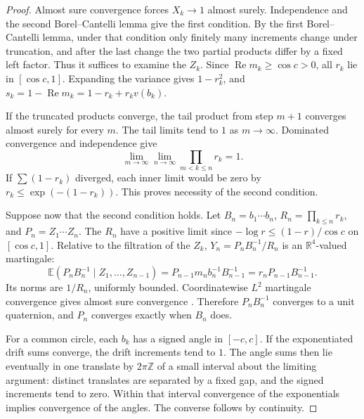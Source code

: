 \documentclass[11pt,reqno]{amsart}
\theoremstyle{definition}
\theoremstyle{remark}
\numberwithin{equation}{section}
\newcommand{\R}{\mathbb{R}}
\newcommand{\Z}{\mathbb{Z}}
\newcommand{\re}{\operatorname{Re}}
\begin{document}
\begin{proof}
Almost sure convergence forces \(X_k\to1\) almost surely.
Independence and the second Borel--Cantelli lemma give the first
condition. By the first Borel--Cantelli lemma, under that condition
only finitely many increments change under truncation, and after
the last change the two partial products differ by a fixed left
factor. Thus it suffices to examine the \(Z_k\). Since
\(\re m_k\ge\cos c>0\), all \(r_k\) lie in \([\cos c,1]\).
Expanding the variance gives \(1-r_k^2\), and
\(s_k=1-\re m_k=1-r_k+r_k v(b_k)\).

If the truncated products converge, the tail product from step
\(m+1\) converges almost surely for every \(m\).
The tail limits tend to \(1\) as \(m\to\infty\).
Dominated convergence and independence give
\[
 \lim_{m\to\infty}\lim_{n\to\infty}\prod_{m<k\le n}r_k=1 .
\]
If \(\sum(1-r_k)\) diverged, each inner limit would be zero by
\(r_k\le\exp(-(1-r_k))\). This proves necessity of the second
condition.

Suppose now that the second condition holds. Let \(B_n=b_1\cdots b_n\),
\(R_n=\prod_{k\le n}r_k\), and \(P_n=Z_1\cdots Z_n\).
The \(R_n\) have a positive limit since \(-\log r\le(1-r)/\cos c\)
on \([\cos c,1]\). Relative to the filtration of the \(Z_k\),
\(Y_n=P_nB_n^{-1}/R_n\) is an \(\R^4\)-valued martingale:
\[
 \mathbb E(P_nB_n^{-1}\mid Z_1,\ldots,Z_{n-1})
 =P_{n-1}m_n b_n^{-1}B_{n-1}^{-1}
 =r_n P_{n-1}B_{n-1}^{-1}.
\]
Its norms are \(1/R_n\), uniformly bounded. Coordinatewise
\(L^2\) martingale convergence gives almost sure convergence
\cite{m6:Williams}. Therefore \(P_nB_n^{-1}\) converges to a unit
quaternion, and \(P_n\) converges exactly when \(B_n\) does.

For a common circle, each \(b_k\) has a signed angle in \([-c,c]\).
If the exponentiated drift sums converge, the drift increments
tend to \(1\). The angle sums then lie eventually in one translate
by \(2\pi\Z\) of a small interval about the limiting argument:
distinct translates are separated by a fixed gap, and the
signed increments tend to zero. Within that interval convergence
of the exponentials implies convergence of the angles. The
converse follows by continuity.
\end{proof}
\end{document}
